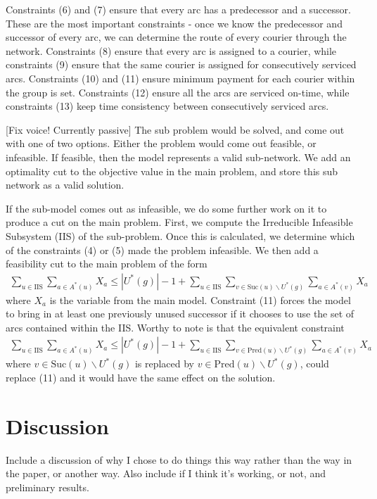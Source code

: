 \documentclass{article}
\newcommand{\Pred}{\text{Pred}}
\newcommand{\Suc}{\text{Suc}}
\begin{document}
Constraints (6) and (7) ensure that every arc has a predecessor and a successor. These are the most important constraints - once we know the predecessor and successor of every arc, we can determine the route of every courier through the network. Constraints (8) ensure that every arc is assigned to a courier, while constraints (9) ensure that the same courier is assigned for consecutively serviced arcs. Constraints (10) and (11) ensure minimum payment for each courier within the group is set. Constraints (12) ensure all the arcs are serviced on-time, while constraints (13) keep time consistency between consecutively serviced arcs.

[Fix voice! Currently passive]
The sub problem would be solved, and come out with one of two options. Either the problem would come out feasible, or infeasible. If feasible, then the model represents a valid sub-network. We add an optimality cut to the objective value in the main problem, and store this sub network as a valid solution.

If the sub-model comes out as infeasible, we do some further work on it to produce a cut on the main problem. First, we compute the Irreducible Infeasible Subsystem (IIS) of the sub-problem. Once this is calculated, we determine which of the constraints (4) or (5) made the problem infeasible. We then add a feasibility cut to the main problem of the form \begin{align}\sum_{u\in \text{IIS}}\sum_{a\in A^*(u)}X_a\leq|U^*(g)|-1+\sum_{u\in \text{IIS}}\sum_{v\in\Suc(u)\backslash U^*(g)}\sum_{a\in A^*(v)}X_a\end{align} where $X_a$ is the variable from the main model. Constraint (11) forces the model to bring in at least one previously unused successor if it chooses to use the set of arcs contained within the IIS. Worthy to note is that the equivalent constraint \begin{align}\sum_{u\in \text{IIS}}\sum_{a\in A^*(u)}X_a\leq|U^*(g)|-1+\sum_{u\in \text{IIS}}\sum_{v\in\Pred(u)\backslash U^*(g)}\sum_{a\in A^*(v)}X_a\end{align} where $v\in\Suc(u)\backslash U^*(g)$ is replaced by $v\in\Pred(u)\backslash U^*(g)$, could replace (11) and it would have the same effect on the solution.

\section{Discussion}
Include a discussion of why I chose to do things this way rather than the way in the paper, or another way. Also include if I think it's working, or not, and preliminary results.
\end{document}
